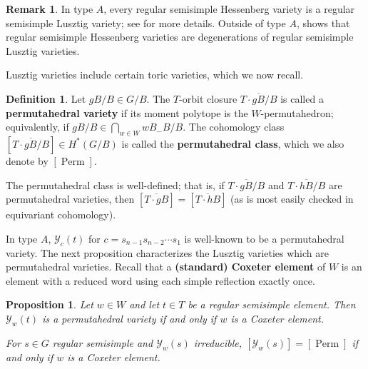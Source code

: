 \documentclass[11pt]{amsart}
\newtheorem{proposition}[Thm]{Proposition}
\theoremstyle{definition}
\newtheorem{definition}[Thm]{Definition}
\newtheorem{remark}[Thm]{Remark}
\DeclareMathOperator{\Perm}{Perm}
\newcommand\defn[1]{{\bf #1}}
\newcommand\calY{{\mathcal Y}}
\begin{document}
\begin{remark}\label{rem:Hessdegen}
	In type $A$, every regular semisimple Hessenberg variety is a regular
	semisimple Lusztig variety; see \cite{BHL25-geomLusztig} for more
	details. Outside of type $A$, \cite[Theorem 5.12]{BHL25-geomLusztig}
	shows that regular semisimple Hessenberg varieties are degenerations
	of regular semisimple Lusztig varieties. 
\end{remark}

Lusztig varieties include certain toric varieties, which we now recall.

\begin{definition}
	Let $gB/B \in G/B$. The $T$-orbit closure $\overline{T \cdot gB/B}$ is
	called a \defn{permutahedral variety} if its moment polytope is the
	$W$-permutahedron; equivalently, if $gB/B \in \bigcap_{w\in W} wB_-B/B$.
	The cohomology class
	$[\overline{T \cdot gB/B}] \in H^*(G/B)$ is called the
	\defn{permutahedral class}, which we also denote by $[\Perm]$.
\end{definition}

The permutahedral class is well-defined; that is, if
$\overline{T \cdot gB/B}$ and $\overline{T \cdot hB/B}$ are permutahedral
varieties, then $[\overline{T \cdot gB}] = [\overline{T \cdot hB}]$
(as is most easily checked in equivariant cohomology).

In type $A$, 
$\calY_{c}(t)$ for $c = s_{n-1}s_{n-2}\cdots s_1$
is well-known to be a permutahedral variety. The next proposition characterizes the Lusztig varieties which are permutahedral varieties. Recall that a \defn{(standard) Coxeter element} of $W$ is an element with a reduced word using each simple reflection exactly once.

\begin{proposition} \label{prop:lusztig-permutahedral}
	Let $w \in W$ and let $t\in T$ be a regular semisimple element. Then
	$\calY_w(t)$ is a permutahedral variety if and only if $w$ is a
	Coxeter element. 
	
	For $s\in G$ regular semisimple and $\calY_w(s)$ irreducible, $[\calY_w(s)]= [\Perm]$ if and only if $w$ is a Coxeter element.
\end{proposition}
\end{document}
